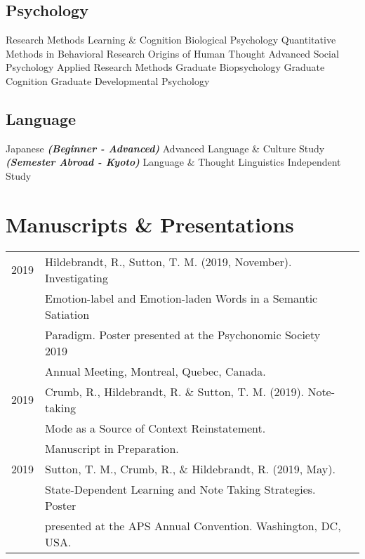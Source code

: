 \documentclass[letterpaper]{deedy-resume_sm} %
\begin{document}
\subsection{Psychology}
Research Methods \textbullet{} 
Learning \& Cognition \textbullet{} 
Biological Psychology \textbullet{} 
Quantitative Methods in Behavioral Research \textbullet{} 
Origins of Human Thought \textbullet{} 
Advanced Social Psychology \textbullet{} 
Applied Research Methods \textbullet{} 
Graduate Biopsychology \textbullet{} 
Graduate Cognition \textbullet{} 
Graduate Developmental Psychology \textbullet{} 
\sectionspace %
\subsection{Language}
Japanese \textbullet{} 
{\footnotesize \textit{\textbf{(Beginner - Advanced)}}} \textbullet{} 
Advanced Language \& Culture Study \textbullet{} 
{\footnotesize \textit{\textbf{(Semester Abroad - Kyoto)}}} \textbullet{} 
Language \& Thought \textbullet{} 
Linguistics Independent Study \textbullet{} 
\sectionspace

\section{Manuscripts \& Presentations} 
\begin{tabular}{rll}
2019 & Hildebrandt, R., Sutton, T. M. (2019, November). Investigating \\
 & Emotion-label and Emotion-laden Words in a Semantic Satiation\\
 & Paradigm. Poster presented at the Psychonomic Society 2019\\ 
 & Annual Meeting, Montreal, Quebec, Canada. \\
2019 & Crumb, R., Hildebrandt, R. \& Sutton, T. M. (2019). Note-taking\\
 & Mode as a Source of Context Reinstatement.\\ 
 & Manuscript in Preparation.\\
2019 & Sutton, T. M., Crumb, R., \& Hildebrandt, R. (2019, May).\\ 
 & State-Dependent Learning and Note Taking Strategies. Poster\\ 
 & presented at the APS Annual Convention. Washington, DC, USA. \\
\end{tabular}
\sectionspace %
\end{document}
